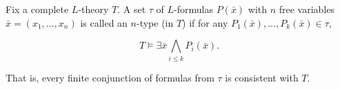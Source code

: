 Fix a complete $L$-theory $T$. A set $\tau$ of $L$-formulas $P(\bar{x})$ with $n$ free variables $\bar{x} = (x_1, \ldots, x_n)$ is called an $n$-type (in $T$) if for any $P_1(\bar{x}), \ldots, P_k(\bar{x}) \in \tau$,

$$T \models \exists \bar{x} \bigwedge_{i \leq k} P_i(\bar{x}).$$

That is, every finite conjunction of formulas from $\tau$ is consistent with $T$.
